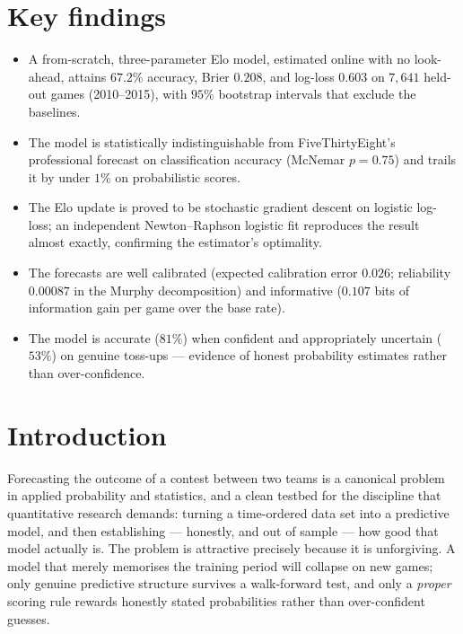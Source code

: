 \documentclass[11pt]{article}
\begin{document}
\section*{Key findings}
\begin{itemize}
\item A from-scratch, three-parameter Elo model, estimated online with no
look-ahead, attains $67.2\%$ accuracy, Brier $0.208$, and log-loss $0.603$ on
$7{,}641$ held-out games (2010--2015), with $95\%$ bootstrap intervals that
exclude the baselines.
\item The model is statistically indistinguishable from FiveThirtyEight's
professional forecast on classification accuracy (McNemar $p=0.75$) and trails it
by under $1\%$ on probabilistic scores.
\item The Elo update is proved to be stochastic gradient descent on logistic
log-loss; an independent Newton--Raphson logistic fit reproduces the result almost
exactly, confirming the estimator's optimality.
\item The forecasts are well calibrated (expected calibration error $0.026$;
reliability $0.00087$ in the Murphy decomposition) and informative ($0.107$ bits
of information gain per game over the base rate).
\item The model is accurate ($81\%$) when confident and appropriately uncertain
($53\%$) on genuine toss-ups --- evidence of honest probability estimates rather
than over-confidence.
\end{itemize}
\bigskip

\section{Introduction}
Forecasting the outcome of a contest between two teams is a canonical problem in
applied probability and statistics, and a clean testbed for the discipline that
quantitative research demands: turning a time-ordered data set into a predictive
model, and then establishing --- honestly, and out of sample --- how good that
model actually is. The problem is attractive precisely because it is unforgiving.
A model that merely memorises the training period will collapse on new games;
only genuine predictive structure survives a walk-forward test, and only a
\emph{proper} scoring rule rewards honestly stated probabilities rather than
over-confident guesses.
\end{document}

